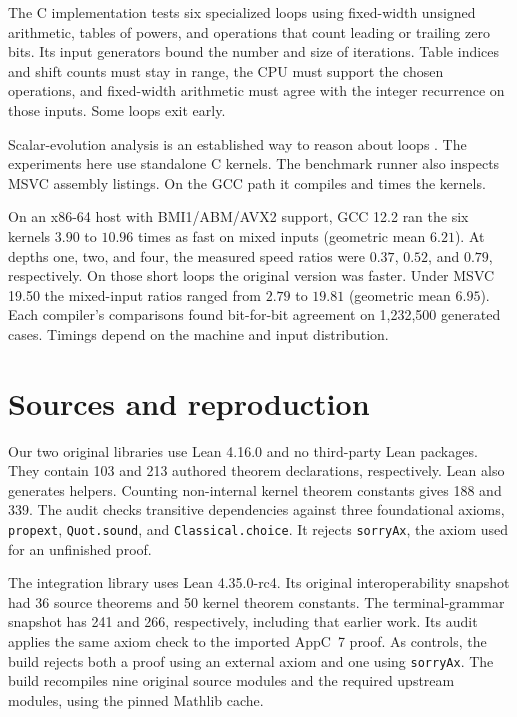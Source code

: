 \documentclass[11pt]{article}
\DeclareRobustCommand{\_}{\ifmmode\sb\else\textunderscore\allowbreak\fi}
\theoremstyle{definition}
\theoremstyle{remark}
\begin{document}
The C implementation tests six specialized loops using fixed-width unsigned arithmetic, tables of powers, and operations that count leading or trailing zero bits. Its input generators bound the number and size of iterations. Table indices and shift counts must stay in range, the CPU must support the chosen operations, and fixed-width arithmetic must agree with the integer recurrence on those inputs. Some loops exit early.

Scalar-evolution analysis is an established way to reason about loops \cite{pop2005scev}. The experiments here use standalone C kernels. The benchmark runner also inspects MSVC assembly listings. On the GCC path it compiles and times the kernels.

On an x86-64 host with BMI1/ABM/AVX2 support, GCC 12.2 ran the six kernels $3.90$ to $10.96$ times as fast on mixed inputs (geometric mean $6.21$). At depths one, two, and four, the measured speed ratios were $0.37$, $0.52$, and $0.79$, respectively. On those short loops the original version was faster. Under MSVC 19.50 the mixed-input ratios ranged from $2.79$ to $19.81$ (geometric mean $6.95$). Each compiler's comparisons found bit-for-bit agreement on 1,232,500 generated cases. Timings depend on the machine and input distribution.

\section{Sources and reproduction}
\label{sec:reproduce}
Our two original libraries use Lean 4.16.0 \cite{moura2021lean4} and no third-party Lean packages. They contain 103 and 213 authored theorem declarations, respectively. Lean also generates helpers. Counting non-internal kernel theorem constants gives 188 and 339. The audit checks transitive dependencies against three foundational axioms, \texttt{propext}, \texttt{Quot.sound}, and \texttt{Classical.choice}. It rejects \texttt{sorryAx}, the axiom used for an unfinished proof.

The integration library uses Lean 4.35.0-rc4. Its original interoperability snapshot had 36 source theorems and 50 kernel theorem constants. The terminal-grammar snapshot has 241 and 266, respectively, including that earlier work. Its audit applies the same axiom check to the imported AppC~7 proof. As controls, the build rejects both a proof using an external axiom and one using \texttt{sorryAx}. The build recompiles nine original source modules and the required upstream modules, using the pinned Mathlib cache.
\end{document}
